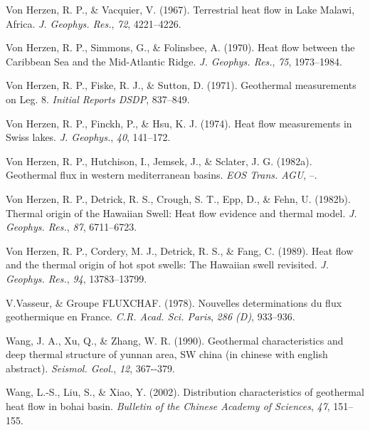 \begin{CSLReferences}{1}{1}
\leavevmode{}%
Von Herzen, R. P., \& Vacquier, V. (1967). Terrestrial heat flow in {Lake Malawi, Africa}. \emph{J. Geophys. Res.}, \emph{72}, 4221--4226.

\leavevmode{}%
Von Herzen, R. P., Simmons, G., \& Folinsbee, A. (1970). Heat flow between the {Caribbean Sea and the Mid-Atlantic Ridge}. \emph{J. Geophys. Res.}, \emph{75}, 1973--1984.

\leavevmode{}%
Von Herzen, R. P., Fiske, R. J., \& Sutton, D. (1971). Geothermal measurements on {Leg. 8}. \emph{Initial Reports DSDP}, 837--849.

\leavevmode{}%
Von Herzen, R. P., Finckh, P., \& Hsu, K. J. (1974). Heat flow measurements in {Swiss} lakes. \emph{J. Geophys.}, \emph{40}, 141--172.

\leavevmode{}%
Von Herzen, R. P., Hutchison, I., Jemsek, J., \& Sclater, J. G. (1982a). Geothermal flux in western mediterranean basins. \emph{EOS Trans. AGU}, --.

\leavevmode{}%
Von Herzen, R. P., Detrick, R. S., Crough, S. T., Epp, D., \& Fehn, U. (1982b). Thermal origin of the {Hawaiian Swell}: Heat flow evidence and thermal model. \emph{J. Geophys. Res.}, \emph{87}, 6711--6723.

\leavevmode{}%
Von Herzen, R. P., Cordery, M. J., Detrick, R. S., \& Fang, C. (1989). Heat flow and the thermal origin of hot spot swells: The {Hawaiian} swell revisited. \emph{J. Geophys. Res.}, \emph{94}, 13783--13799.

\leavevmode{}%
V.Vasseur, \& Groupe FLUXCHAF. (1978). Nouvelles determinations du flux geothermique en {France}. \emph{C.R. Acad. Sci. Paris}, \emph{286 (D)}, 933--936.

\leavevmode{}%
Wang, J. A., Xu, Q., \& Zhang, W. R. (1990). Geothermal characteristics and deep thermal structure of yunnan area, SW china (in chinese with english abstract). \emph{Seismol. Geol.}, \emph{12}, 367-\/-379.

\leavevmode{}%
Wang, L.-S., Liu, S., \& Xiao, Y. (2002). Distribution characteristics of geothermal heat flow in bohai basin. \emph{Bulletin of the Chinese Academy of Sciences}, \emph{47}, 151--155.


\end{CSLReferences}

